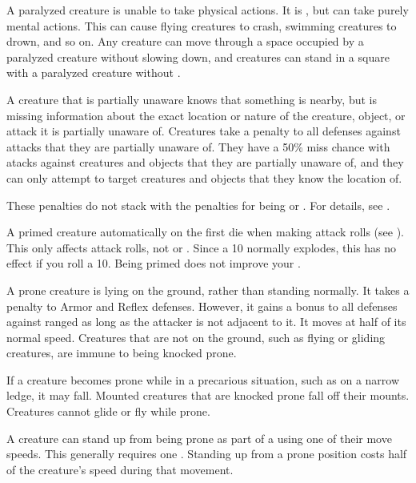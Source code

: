    A paralyzed creature is unable to take physical actions. It is \helpless, but can take purely mental actions. This can cause flying creatures to crash, swimming creatures to drown, and so on. Any creature can move through a space occupied by a paralyzed creature without slowing down, and creatures can stand in a square with a paralyzed creature without \squeezing.

   A creature that is partially unaware knows that something is nearby, but is missing information about the exact location or nature of the creature, object, or attack it is partially unaware of.
  Creatures take a  penalty to all defenses against attacks that they are partially unaware of.
  They have a 50\% miss chance with  atacks against creatures and objects that they are partially unaware of, and they can only attempt to target creatures and objects that they know the location of.

  These penalties do not stack with the penalties for being \unaware or \unsteady.
  For details, see .

   A primed creature automatically  on the first die when making attack rolls (see ).
  This only affects attack rolls, not  or .
  Since a 10 normally explodes, this has no effect if you roll a 10.
  Being primed does not improve your .

   A prone creature is lying on the ground, rather than standing normally.
  It takes a  penalty to Armor and Reflex defenses.
  However, it gains a  bonus to all defenses against ranged  as long as the attacker is not adjacent to it.
  It moves at half of its normal speed.
  Creatures that are not on the ground, such as flying or gliding creatures, are immune to being knocked prone.

  If a creature becomes prone while in a precarious situation, such as on a narrow ledge, it may fall.
  Mounted creatures that are knocked prone fall off their mounts.
  Creatures cannot glide or fly while prone.

  A creature can stand up from being prone as part of a  using one of their move speeds.
  This generally requires one .
  Standing up from a prone position costs half of the creature's speed during that movement.

